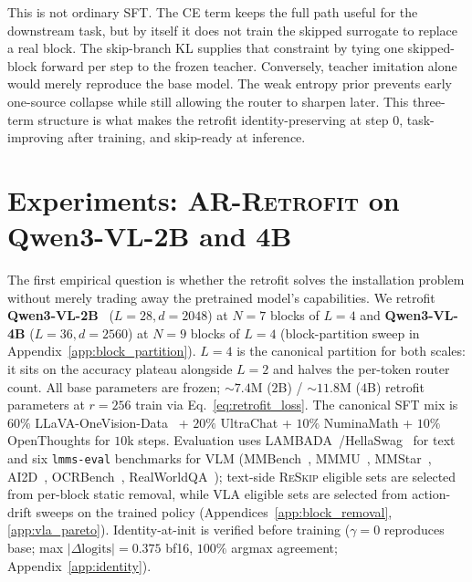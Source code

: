 \documentclass{article}
\newcommand{\reskip}{\textsc{ReSkip}}
\newcommand{\retrofit}{\textsc{AR-Retrofit}}
\begin{document}
This is not ordinary SFT. The CE term keeps the full path useful for the downstream task, but by itself it does not train the skipped surrogate to replace a real block. The skip-branch KL supplies that constraint by tying one skipped-block forward per step to the frozen teacher. Conversely, teacher imitation alone would merely reproduce the base model. The weak entropy prior prevents early one-source collapse while still allowing the router to sharpen later. This three-term structure is what makes the retrofit identity-preserving at step $0$, task-improving after training, and skip-ready at inference.

\section{Experiments: \retrofit{} on Qwen3-VL-2B and 4B}
\label{sec:experiments}
\label{sec:exp_retrofit}

The first empirical question is whether the retrofit solves the installation problem without merely trading away the pretrained model's capabilities. We retrofit \textbf{Qwen3-VL-2B}~\citep{bai2025qwen3vl} ($L{=}28, d{=}2048$) at $N{=}7$ blocks of $L{=}4$ and \textbf{Qwen3-VL-4B} ($L{=}36, d{=}2560$) at $N{=}9$ blocks of $L{=}4$ (block-partition sweep in Appendix~\ref{app:block_partition}). $L{=}4$ is the canonical partition for both scales: it sits on the accuracy plateau alongside $L{=}2$ and halves the per-token router count. All base parameters are frozen; $\sim$$7.4$M ($2$B) / $\sim$$11.8$M ($4$B) retrofit parameters at $r{=}256$ train via Eq.~\ref{eq:retrofit_loss}. The canonical SFT mix is $60\%$ LLaVA-OneVision-Data~\citep{li2024llavaonevision} + $20\%$ UltraChat + $10\%$ NuminaMath + $10\%$ OpenThoughts for $10$k steps. Evaluation uses LAMBADA~\citep{paperno2016lambada}/HellaSwag~\citep{zellers2019hellaswag} for text and six \texttt{lmms-eval} benchmarks for VLM (MMBench~\citep{liu2023mmbench}, MMMU~\citep{yue2024mmmu}, MMStar~\citep{chen2024mmstar}, AI2D~\citep{kembhavi2016ai2d}, OCRBench~\citep{liu2024ocrbench}, RealWorldQA~\citep{grok2024realworldqa}); text-side \reskip{} eligible sets are selected from per-block static removal, while VLA eligible sets are selected from action-drift sweeps on the trained policy (Appendices~\ref{app:block_removal},\,\ref{app:vla_pareto}). Identity-at-init is verified before training ($\gamma{=}0$ reproduces base; max $|\Delta\text{logits}|=0.375$ bf16, $100\%$ argmax agreement; Appendix~\ref{app:identity}).
\end{document}
